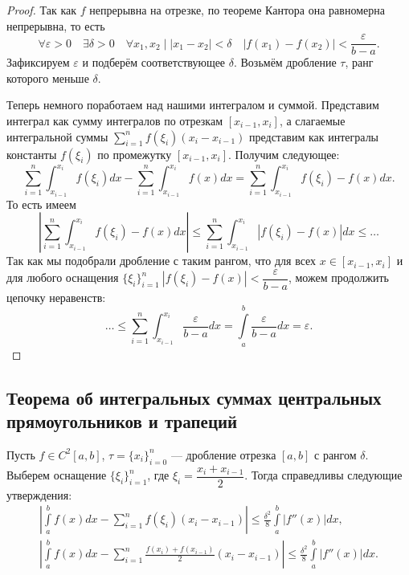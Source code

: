 \begin{proof}
	Так как \(f\) непрерывна на отрезке, по теореме Кантора она равномерна непрерывна, то есть \[
		\forall \varepsilon > 0 \quad \exists \delta > 0 \quad \forall x_1, x_2 \mid |x_1 - x_2| < \delta \quad |f(x_1) - f(x_2)| < \frac{\varepsilon}{b - a}.
	\]
	Зафиксируем \(\varepsilon\) и подберём соответствующее \(\delta\). Возьмём дробление \(\tau\), ранг которого меньше \(\delta\).
	
	Теперь немного поработаем над нашими интегралом и суммой. Представим интеграл как сумму интегралов по отрезкам \([x_{i - 1}, x_i]\), а слагаемые интегральной суммы \(\sum\limits_{i = 1}^n f(\xi_i) (x_i - x_{i - 1})\) представим как интегралы константы \(f(\xi_i)\) по промежутку \([x_{i - 1}, x_i]\). Получим следующее: \[
		\sum_{i = 1}^n \int_{x_{i - 1}}^{x_i} f(\xi_i) dx - \sum_{i = 1}^n \int_{x_{i - 1}}^{x_i} f(x) dx = \sum_{i = 1}^n \int_{x_{i - 1}}^{x_i} f(\xi_i) - f(x) dx.
	\]
	То есть имеем \[
		\left|\sum_{i = 1}^n \int_{x_{i - 1}}^{x_i} f(\xi_i) - f(x) dx \right| \leqslant \sum_{i = 1}^n \int_{x_{i - 1}}^{x_i} \left|f(\xi_i) - f(x) \right| dx \leqslant \ldots
	\]
	Так как мы подобрали дробление с таким рангом, что для всех \(x \in [x_{i - 1}, x_i]\) и для любого оснащения \(\{\xi_i\}_{i = 1}^n \ |f(\xi_i) - f(x)| < \dfrac{\varepsilon}{b - a}\), можем продолжить цепочку неравенств: \[
		\ldots \leqslant \sum_{i = 1}^n \int_{x_{i - 1}}^{x_i} \frac{\varepsilon}{b - a} dx = \int\limits_a^b \frac{\varepsilon}{b - a} dx = \varepsilon.
	\]
\end{proof}

\subsection{Теорема об интегральных суммах центральных прямоугольников и трапеций}

\hypertarget{trap}{}
\begin{theorem}
	Пусть \(f \in C^2 [a, b]\), \(\tau = \{x_i\}_{i = 0}^n\) --- дробление отрезка \([a, b]\) с рангом \(\delta\). Выберем оснащение \(\{\xi_i\}_{i = 1}^n\), где \(\xi_i = \dfrac{x_i + x_{i - 1}}{2}\). Тогда справедливы следующие утверждения:
	\begin{gather}
		\label{intsum1}
		\left|\int\limits_a^b f(x) dx - \sum_{i = 1}^n f(\xi_i) (x_i - x_{i - 1}) \right| \leqslant \frac{\delta^2}{8} \int\limits_a^b |f''(x)| dx, \\
		\label{intsum2}
		\left|\int\limits_a^b f(x) dx - \sum_{i = 1}^n \frac{f(x_i) + f(x_{i - 1})}{2} (x_i - x_{i - 1})\right| \leqslant \frac{\delta^2}{8} \int\limits_a^b |f''(x)| dx.
	\end{gather}
\end{theorem}

